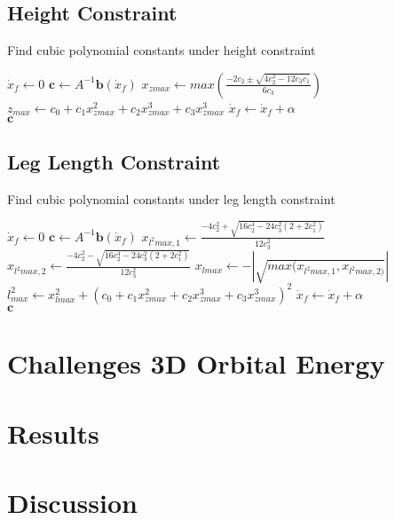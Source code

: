 \subsection{Height Constraint}
\begin{algorithm}
\caption{Find cubic polynomial constants under height constraint}\label{findpolz}
\begin{algorithmic}[1]
    \State $\dot{x}_{f}\gets 0$
        \Repeat
            \State $\boldsymbol{c}\gets A^{-1}\boldsymbol{b}(\dot{x}_{f})$ 
            \State $x_{zmax}\gets max(\frac{-2c_2 \pm \sqrt{4c_2^2-12c_3c_1}}{6c_3})$ 
            \State $z_{max} \gets c_0 + c_1x_{zmax}^2 + c_2x_{zmax}^3+ c_3x_{zmax}^3$ 
            \State $\dot{x}_{f} \gets \dot{x}_{f}+\alpha$   
        \\
    \Return $\boldsymbol{c}$
    \EndProcedure       
\end{algorithmic}
\end{algorithm}

\subsection{Leg Length Constraint}
\begin{algorithm}
\caption{Find cubic polynomial constants under leg length constraint}\label{findpoll}
\begin{algorithmic}[1]
    \State $\dot{x}_{f}\gets 0$
        \Repeat
            \State $\boldsymbol{c}\gets A^{-1}\boldsymbol{b}(\dot{x}_{f})$ 
            \State $x_{l^2max,1} \gets \frac{-4c_2^2+\sqrt{16c_2^4-24c_3^2(2+2c_1^2)}}{12c_3^2}$ 
            \State $x_{l^2max,2} \gets \frac{-4c_2^2-\sqrt{16c_2^4-24c_3^2(2+2c_1^2)}}{12c_3^2}$ 
            \State $x_{lmax}\gets-|\sqrt{max(x_{l^2max,1},x_{l^2max,2)}}|$                
            \State $l_{max}^2 \gets x_{lmax}^2 + (c_0 + c_1x_{zmax}^2 + c_2x_{zmax}^3+ c_3x_{zmax}^3)^2$ 
            \State $\dot{x}_{f} \gets \dot{x}_{f}+\alpha$   
        \\
    \Return $\boldsymbol{c}$
    \EndProcedure       
\end{algorithmic}
\end{algorithm}

\section{Challenges 3D Orbital Energy}

\section{Results}

\section{Discussion}
